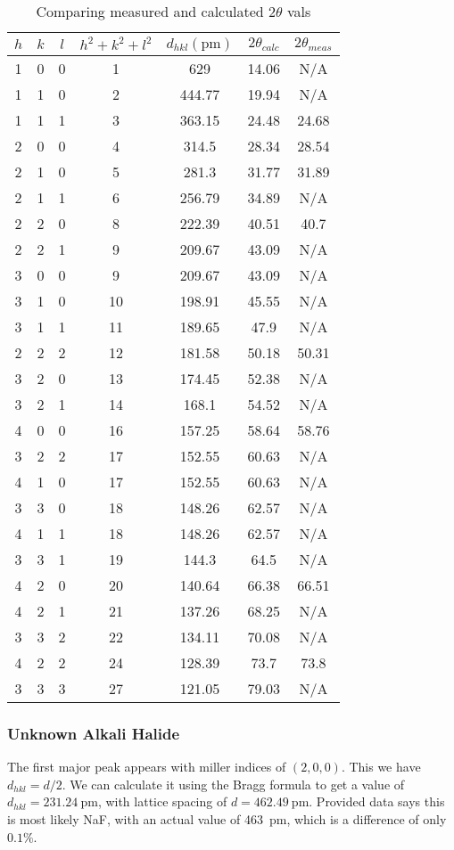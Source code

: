 \documentclass[letterpaper,12pt]{article}
\begin{document}
\begin{table}[H]
  \centering
  \begin{tabular}{c|c|c|c|c|c|c}
    $h$ & $k$ & $l$ & $h^2+k^2+l^2$ & $d_{hkl}(\si{\pico\meter})$ &  $2\theta_{calc}$ & $2\theta_{meas}$ \\ \hline
    1 & 0 & 0 & 1  & 629    & 14.06 & N/A   \\
    1 & 1 & 0 & 2  & 444.77 & 19.94 & N/A   \\
    1 & 1 & 1 & 3  & 363.15 & 24.48 & 24.68 \\
    2 & 0 & 0 & 4  & 314.5  & 28.34 & 28.54 \\
    2 & 1 & 0 & 5  & 281.3  & 31.77 & 31.89 \\
    2 & 1 & 1 & 6  & 256.79 & 34.89 & N/A   \\
    2 & 2 & 0 & 8  & 222.39 & 40.51 & 40.7  \\
    2 & 2 & 1 & 9  & 209.67 & 43.09 & N/A   \\
    3 & 0 & 0 & 9  & 209.67 & 43.09 & N/A   \\
    3 & 1 & 0 & 10 & 198.91 & 45.55 & N/A   \\
    3 & 1 & 1 & 11 & 189.65 & 47.9  & N/A   \\
    2 & 2 & 2 & 12 & 181.58 & 50.18 & 50.31 \\
    3 & 2 & 0 & 13 & 174.45 & 52.38 & N/A   \\
    3 & 2 & 1 & 14 & 168.1  & 54.52 & N/A   \\
    4 & 0 & 0 & 16 & 157.25 & 58.64 & 58.76 \\
    3 & 2 & 2 & 17 & 152.55 & 60.63 & N/A   \\
    4 & 1 & 0 & 17 & 152.55 & 60.63 & N/A   \\
    3 & 3 & 0 & 18 & 148.26 & 62.57 & N/A   \\
    4 & 1 & 1 & 18 & 148.26 & 62.57 & N/A   \\
    3 & 3 & 1 & 19 & 144.3  & 64.5  & N/A   \\
    4 & 2 & 0 & 20 & 140.64 & 66.38 & 66.51 \\
    4 & 2 & 1 & 21 & 137.26 & 68.25 & N/A   \\
    3 & 3 & 2 & 22 & 134.11 & 70.08 & N/A   \\
    4 & 2 & 2 & 24 & 128.39 & 73.7  & 73.8  \\
    3 & 3 & 3 & 27 & 121.05 & 79.03 & N/A  
  \end{tabular}
  \caption{Comparing measured and calculated $2\theta$ vals}
\end{table}
\subsubsection{Unknown Alkali Halide}
The first major peak appears with miller indices of $(2,0,0)$. This we have $d_{hkl}=d/2$. We can calculate it using the Bragg formula to get a value of $d_{hkl}=\SI{231.24}{\pico\meter}$, with lattice spacing of $d=\SI{462.49}{\pico\meter}$. Provided data says this is most likely NaF, with an actual value of \SI{463}{\pico\meter}, which is a difference of only $0.1\%$. 
\end{document}
